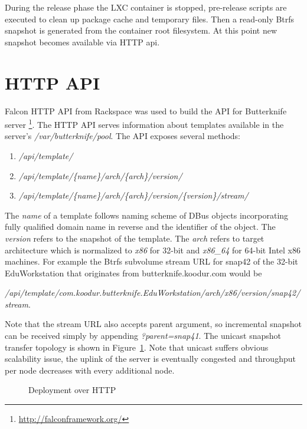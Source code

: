 \documentclass[a4paper,11pt]{kth-mag}
\begin{document}
During the release phase the LXC container is stopped, pre-release
scripts are executed to clean up package cache and temporary files.
Then a read-only Btrfs snapshot is generated from the container root filesystem.
At this point new snapshot becomes available via HTTP \gls{api}.


\clearpage

\section{HTTP API}

Falcon HTTP API from Rackspace was used to build the
API for Butterknife server
\footnote{\url{http://falconframework.org/}}.
The HTTP API serves information about templates
available in the server's \emph{/var/butterknife/pool}.
The API exposes several methods:

\begin{enumerate}
\item \emph{/api/template/}
\item \emph{/api/template/\{name\}/arch/\{arch\}/version/}
\item \emph{/api/template/\{name\}/arch/\{arch\}/version/\{version\}/stream/}
\end{enumerate}

The \emph{name} of a template follows naming scheme of DBus objects
incorporating fully qualified domain name in reverse and the identifier
of the object.
The \emph{version} refers to the snapshot of the template.
The \emph{arch} refers to target architecture which is normalized
to \emph{x86} for 32-bit and \emph{x86\_64} for 64-bit Intel x86 machines.
For example the Btrfs subvolume stream URL for
snap42 of the 32-bit EduWorkstation that originates from butterknife.koodur.com would be

\emph{/api/template/com.koodur.butterknife.EduWorkstation/arch/x86/version/snap42/stream}.

Note that the stream URL also accepts parent argument,
so incremental snapshot can be received simply by appending
\emph{?parent=snap41}.
The unicast snapshot transfer topology is
shown in Figure~\ref{fig:butterknife-usecase-http}.
Note that unicast suffers obvious scalability issue,
the uplink of the server is eventually congested and
throughput per node decreases with every additional node.

\begin{figure}[!htb]
\centering
\scalebox{0.5}{}
\caption{Deployment over HTTP}
\label{fig:butterknife-usecase-http}
\end{figure}
\end{document}
